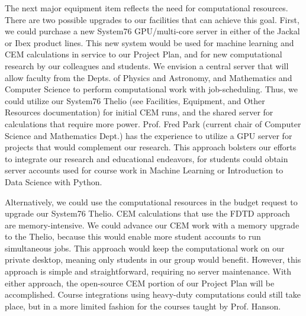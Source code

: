 \documentclass[../../main.tex]{subfiles}
\begin{document}
The next major equipment item reflects the need for computational resources.  There are two possible upgrades to our facilities that can achieve this goal.  First, we could purchase a new System76 GPU/multi-core server in either of the Jackal or Ibex product lines.  This new system would be used for machine learning and CEM calculations in service to our Project Plan, and for new computational research by our colleagues and students.  We envision a central server that will allow faculty from the Depts. of Physics and Astronomy, and Mathematics and Computer Science to perform computational work with job-scheduling.  Thus, we could utilize our System76 Thelio (see Facilities, Equipment, and Other Resources documentation) for initial CEM runs, and the shared server for calculations that require more power.  Prof. Fred Park (current chair of Computer Science and Mathematics Dept.) has the experience to utilize a GPU server for projects that would complement our research.  This approach bolsters our efforts to integrate our research and educational endeavors, for students could obtain server accounts used for course work in Machine Learning or Introduction to Data Science with Python. \\ \vspace{2.5mm}

Alternatively, we could use the computational resources in the budget request to upgrade our System76 Thelio.  CEM calculations that use the FDTD approach are memory-intensive.  We could advance our CEM work with a memory upgrade to the Thelio, because this would enable more student accounts to run simultaneous jobs.  This approach would keep the computational work on our private desktop, meaning only students in our group would benefit.  However, this approach is simple and straightforward, requiring no server maintenance.  With either approach, the open-source CEM portion of our Project Plan will be accomplished.  Course integrations using heavy-duty computations could still take place, but in a more limited fashion for the courses taught by Prof. Hanson. \\ \vspace{2.5mm}
\end{document}
